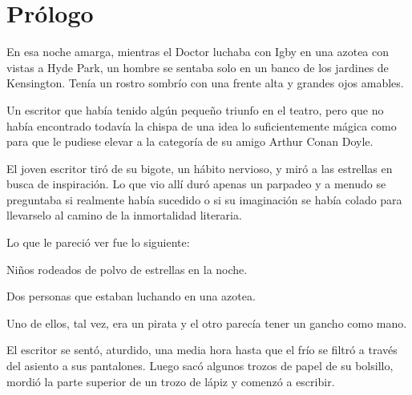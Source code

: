 \chapter*{Prólogo}

En esa noche amarga, mientras el Doctor luchaba con Igby en una azotea con vistas a Hyde Park, un hombre se sentaba solo en un banco de los jardines de Kensington. Tenía un rostro sombrío con una frente alta y grandes ojos amables.

Un escritor que había tenido algún pequeño triunfo en el teatro, pero que no había encontrado todavía la chispa de una idea lo suficientemente mágica como para que le pudiese elevar a la categoría de su amigo Arthur Conan Doyle.

El joven escritor tiró de su bigote, un hábito nervioso, y miró a las estrellas en busca de inspiración. Lo que vio allí duró apenas un parpadeo y a menudo se preguntaba si realmente había sucedido o si su imaginación se había colado para llevarselo al camino de la inmortalidad literaria.

Lo que le pareció ver fue lo siguiente:

Niños rodeados de polvo de estrellas en la noche.

Dos personas que estaban luchando en una azotea.

Uno de ellos, tal vez, era un pirata y el otro parecía tener un gancho como mano.

El escritor se sentó, aturdido, una media hora hasta que el frío se filtró a través del asiento a sus pantalones. Luego sacó algunos trozos de papel de su bolsillo, mordió la parte superior de un trozo de lápiz y comenzó a escribir.
